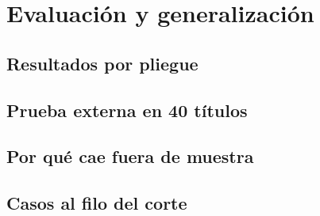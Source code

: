 \section{Evaluación y generalización}\label{sec:evaluacion}

\subsection{Resultados por pliegue}

\subsection{Prueba externa en 40 títulos}\label{sec:evaluacion-externa}

\subsection{Por qué cae fuera de muestra}\label{sec:evaluacion-caida}

\subsection{Casos al filo del corte}
